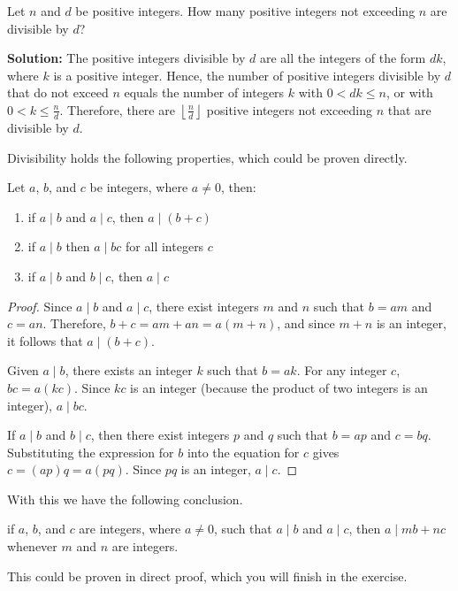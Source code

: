     \begin{problem}
        Let \( n \) and \( d \) be positive integers. How many positive integers not exceeding \( n \) are divisible by \( d \)?
    \end{problem}
    \textbf{Solution:} The positive integers divisible by \( d \) are all the integers of the form \( dk \), where \( k \) is a positive integer. Hence, the number of positive integers divisible by \( d \) that do not exceed \( n \) equals the number of integers \( k \) with \( 0 < dk \leq n \), or with \( 0 < k \leq \frac{n}{d} \). Therefore, there are \( \left\lfloor \frac{n}{d} \right\rfloor \) positive integers not exceeding \( n \) that are divisible by \( d \).

    Divisibility holds the following properties, which could be proven directly.
    \begin{theorem} \label{Properties of Divisibility}
        Let $a$, $b$, and $c$ be integers, where $a\neq 0$, then:
        \begin{enumerate}
            \item if $a \mid b$ and $a \mid c$, then $a \mid (b+c)$
            \item if $a \mid b$ then $a \mid bc$ for all integers $c$
            \item if $a \mid b$ and $b\mid c$, then $a \mid c$
        \end{enumerate}
    \end{theorem}
    \begin{proof}
        Since \( a \mid b \) and \( a \mid c \), there exist integers \( m \) and \( n \) such that \( b = am \) and \( c = an \). Therefore, \( b+c = am + an = a(m+n) \), and since \( m+n \) is an integer, it follows that \( a \mid (b+c) \).
        
        Given \( a \mid b \), there exists an integer \( k \) such that \( b = ak \). For any integer \( c \), \( bc = a(kc) \). Since \( kc \) is an integer (because the product of two integers is an integer), \( a \mid bc \).
        
        If \( a \mid b \) and \( b \mid c \), then there exist integers \( p \) and \( q \) such that \( b = ap \) and \( c = bq \). Substituting the expression for \( b \) into the equation for \( c \) gives \( c = (ap)q = a(pq) \). Since \( pq \) is an integer, \( a \mid c \).
    \end{proof}
    With this we have the following conclusion.
    \begin{corollary}\label{div1}
        if $a$, $b$, and $c$ are integers, where $a\neq 0$, such that $a\mid b$ and $a\mid c$, then $a\mid mb + nc$ whenever $m$ and $n$ are integers.
    \end{corollary}
    This could be proven in direct proof, which you will finish in the exercise.

